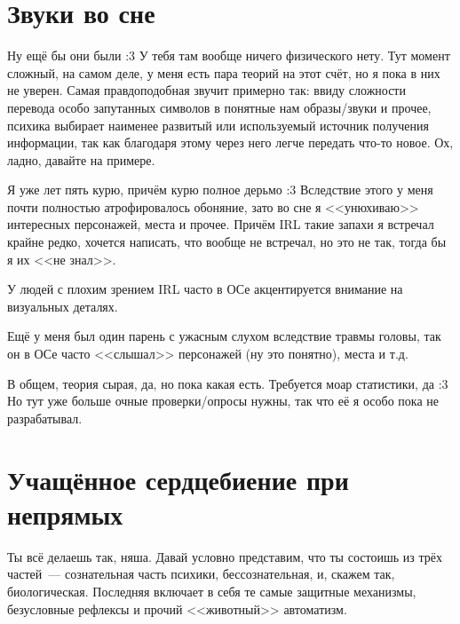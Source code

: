 \documentclass[a4paper,14pt,oneside]{memoir}
\begin{document}
\section{Звуки во сне}
Ну ещё бы они были :3 У тебя там вообще ничего физического нету. Тут момент сложный, на самом деле, у меня есть пара теорий на этот счёт, но я пока в них не уверен. 
Самая правдоподобная звучит примерно так: ввиду сложности перевода особо запутанных символов в понятные нам образы/звуки и прочее, психика выбирает наименее развитый или используемый источник получения информации, так как благодаря этому через него легче передать что-то новое. Ох, ладно, давайте на примере.

Я уже лет пять курю, причём курю полное дерьмо :3 Вследствие этого у меня почти полностью атрофировалось обоняние, зато во сне я <<унюхиваю>> интересных персонажей, места и прочее. Причём IRL такие запахи я встречал крайне редко, хочется написать, что вообще не встречал, но это не так, тогда бы я их <<не знал>>.

У людей с плохим зрением IRL часто в ОСе акцентируется внимание на визуальных деталях. 

Ещё у меня был один парень с ужасным слухом вследствие травмы головы, так он в ОСе часто <<слышал>> персонажей (ну это понятно), места и т.д. 

В общем, теория сырая, да, но пока какая есть. Требуется моар статистики, да :3 Но тут уже больше очные проверки/опросы нужны, так что её я особо пока не разрабатывал. 




\section{Учащённое сердцебиение при непрямых}

\medskip

Ты всё делаешь так, няша. Давай условно представим, что ты состоишь из трёх частей~--- сознательная часть психики, бессознательная, и, скажем так, биологическая. Последняя включает в себя те самые защитные механизмы, безусловные рефлексы и прочий <<животный>> автоматизм.
\end{document}
